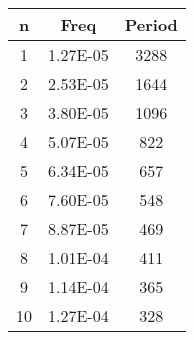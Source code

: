 \begin{tabular}{ccc}
\toprule
\textbf{n} & \textbf{Freq} & \textbf{Period} \\
\midrule
         1 &      1.27E-05 &            3288 \\
         2 &      2.53E-05 &            1644 \\
         3 &      3.80E-05 &            1096 \\
         4 &      5.07E-05 &             822 \\
         5 &      6.34E-05 &             657 \\
         6 &      7.60E-05 &             548 \\
         7 &      8.87E-05 &             469 \\
         8 &      1.01E-04 &             411 \\
         9 &      1.14E-04 &             365 \\
        10 &      1.27E-04 &             328 \\
\bottomrule
\end{tabular}
